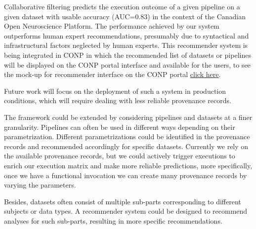 \documentclass[conference]{IEEEtran}
\begin{document}
Collaborative filtering predicts the execution outcome of a given pipeline
on a given dataset with usable accuracy (AUC=0.83) in the context of the
Canadian Open Neuroscience Platform. The performance achieved by our system
outperforms
human expert recommendations, presumably due to syntactical and
infrastructural factors neglected by human experts. This recommender system is being integrated in CONP in which the recommended list of datasets or pipelines will be displayed on the CONP portal interface and available for the users, to see the mock-up for recommender interface on the CONP portal \href{https://github.com/mandana-mazaheri/Pipelines-datasets-recommender-paper/blob/master/result/mockup_for_recommender_on_portal.png}{ click here}. 

Future work will focus on the deployment of such a system in production conditions, which will require dealing with less reliable provenance records.

The framework could be extended by considering pipelines and datasets 
at a finer granularity. Pipelines can often be used in different ways 
depending on their parametrization. Different parametrizations could 
be identified in the provenance records and recommended accordingly 
for specific datasets.
Currently we rely on the available provenance records, but we could actively trigger executions to enrich our execution matrix and make more reliable predictions, more specifically, once we have a functional invocation we can create many provenance records by varying the parameters.


Besides, datasets often consist of multiple 
sub-parts corresponding to different subjects or data types. A recommender 
system could be designed to recommend analyses for such sub-parts, 
resulting in more specific recommendations.






\end{document}
